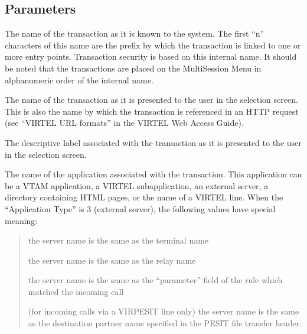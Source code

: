\documentclass[letterpaper,10pt,english]{sphinxmanual}
\begin{document}
\subsection{Parameters}
\label{\detokenize{connectivity_guide:index-115}}\label{\detokenize{connectivity_guide:id65}}\begin{description}
\sphinxAtStartPar
The name of the transaction as it is known to the system. The first “n” characters of this name are the prefix by which the transaction is linked to one or more entry points. Transaction security is based on this internal name. It should be noted that the transactions are placed on the Multi\sphinxhyphen{}Session Menu in alphanumeric order of the internal name.

\sphinxAtStartPar
The name of the transaction as it is presented to the user in the selection screen. This is also the name by which the transaction is referenced in an HTTP request (see “VIRTEL URL formats” in the VIRTEL Web Access Guide).

\sphinxAtStartPar
The descriptive label associated with the transaction as it is presented to the user in the selection screen.

\sphinxAtStartPar
The name of the application associated with the transaction. This application can be a VTAM application, a VIRTEL sub\sphinxhyphen{}application, an external server, a directory containing HTML pages, or the name of a VIRTEL line. When the “Application Type” is 3 (external server), the following values have special meaning:
\begin{quote}
\begin{description}
\sphinxAtStartPar
the server name is the same as the terminal name

\sphinxAtStartPar
the server name is the same as the relay name

\sphinxAtStartPar
the server name is the same as the “parameter” field of the rule which matched the incoming call

\sphinxlineitem{=}
\sphinxAtStartPar
(for incoming calls via a VIRPESIT line only) the server name is the same as the destination partner name specified in the PESIT file transfer header.

\end{description}
\end{quote}


\end{description}
\end{document}
